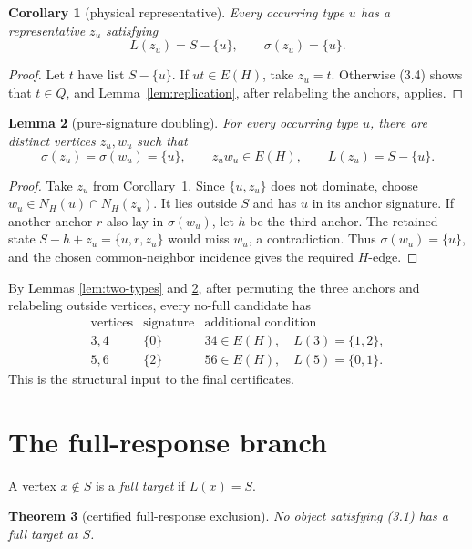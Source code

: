 \documentclass[11pt]{article}
\newtheorem{theorem}{Theorem}[section]
\newtheorem{lemma}[theorem]{Lemma}
\newtheorem{corollary}[theorem]{Corollary}
\theoremstyle{definition}
\theoremstyle{remark}
\begin{document}
\begin{corollary}[physical representative]\label{cor:physical}
Every occurring type \(u\) has a representative \(z_u\) satisfying
\[
  L(z_u)=S-\{u\},\qquad \sigma(z_u)=\{u\}.
\tag{3.12}
\]
\end{corollary}

\begin{proof}
Let \(t\) have list \(S-\{u\}\).  If \(ut\in E(H)\), take \(z_u=t\).
Otherwise (3.4) shows that \(t\in Q\), and
Lemma~\ref{lem:replication}, after relabeling the anchors, applies.
\end{proof}

\begin{lemma}[pure-signature doubling]\label{lem:doubling}
For every occurring type \(u\), there are distinct vertices \(z_u,w_u\)
such that
\[
 \sigma(z_u)=\sigma(w_u)=\{u\},
 \qquad z_uw_u\in E(H),
 \qquad L(z_u)=S-\{u\}.
\tag{3.13}
\]
\end{lemma}

\begin{proof}
Take \(z_u\) from Corollary~\ref{cor:physical}.  Since \(\{u,z_u\}\) does
not dominate, choose
\(w_u\in N_H(u)\cap N_H(z_u)\).  It lies outside \(S\) and has \(u\) in
its anchor signature.  If another anchor \(r\) also lay in
\(\sigma(w_u)\), let \(h\) be the third anchor.  The retained state
\(S-h+z_u=\{u,r,z_u\}\) would miss \(w_u\), a contradiction.
Thus \(\sigma(w_u)=\{u\}\), and the chosen common-neighbor incidence gives
the required \(H\)-edge.
\end{proof}

By Lemmas \ref{lem:two-types} and \ref{lem:doubling}, after permuting the
three anchors and relabeling outside vertices, every no-full candidate has
\[
\begin{array}{c|c|c}
\text{vertices}&\text{signature}&\text{additional condition}\\ \hline
3,4&\{0\}&34\in E(H),\quad L(3)=\{1,2\},\\
5,6&\{2\}&56\in E(H),\quad L(5)=\{0,1\}.
\end{array}
\tag{3.14}
\]
This is the structural input to the final certificates.

\section{The full-response branch}\label{sec:full}

A vertex \(x\notin S\) is a \emph{full target} if \(L(x)=S\).

\begin{theorem}[certified full-response exclusion]\label{thm:full}
No object satisfying (3.1) has a full target at \(S\).
\end{theorem}
\end{document}
